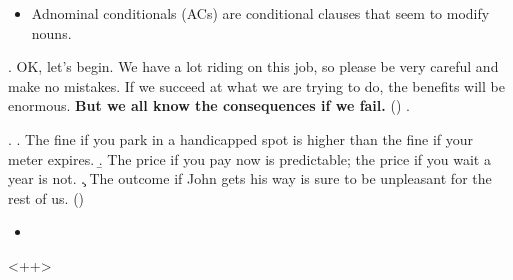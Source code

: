 \documentclass[letterpaper,12pt]{article}
\begin{document}
\begin{itemize}
  \item Adnominal conditionals (ACs) are conditional clauses that seem to modify nouns.
\end{itemize}
\ex. OK, let's begin.
We have a lot riding on this job, so please be very careful and make no mistakes.
If we succeed at what we are trying to do, the benefits will be enormous.
\textbf{But we all know the consequences if we fail.} \hfill (\cite{lasersohn1996adnominal})
\z.

\ex.
\a. The fine if you park in a handicapped spot is higher than the fine if your
meter expires.
\b. The price if you pay now is predictable; the price if you wait a year is not.
\c. The outcome if John gets his way is sure to be unpleasant for the rest of
us. \hfill (\cite{lasersohn1996adnominal})

\begin{itemize}
  \item 
\end{itemize}<++>
\end{document}
